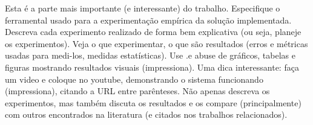 
\label{Cap:ExperimentosResultados}

Esta é a parte mais importante (e interessante) do trabalho. Especifique o ferramental usado para a experimentação empírica da solução implementada. Descreva cada experimento realizado de forma bem explicativa (ou seja, planeje os experimentos). Veja o que experimentar, o que são resultados (erros e métricas usadas para medi-los, medidas estatísticas). Use .e abuse de gráficos, tabelas e figuras mostrando resultados visuais (impressiona). Uma dica interessante: faça um video e coloque no youtube, demonstrando o sistema funcionando (impressiona), citando a URL entre parênteses. Não apenas descreva os experimentos, mas também discuta os resultados e os compare (principalmente) com outros encontrados na literatura (e citados nos trabalhos relacionados).

